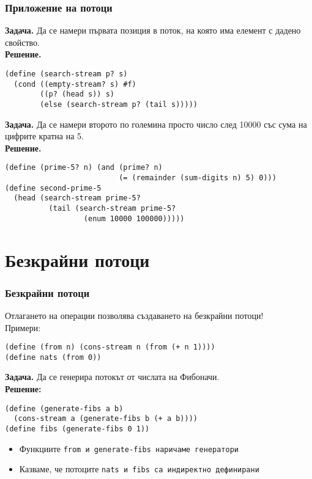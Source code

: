\documentclass{beamer}
\begin{document}
\begin{frame}[fragile]
  \frametitle{Приложение на потоци}

  \small
  \textbf{Задача.} Да се намери първата позиция в поток, на която има елемент с дадено свойство.\\
  \pause
  \textbf{Решение.}
\begin{lstlisting}
(define (search-stream p? s)
  (cond ((empty-stream? s) #f)
        ((p? (head s)) s)
        (else (search-stream p? (tail s)))))
\end{lstlisting}
  \pause
  \textbf{Задача.} Да се намери второто по големина просто число след 10000 със сума на цифрите кратна на 5.\\
  \pause
  \textbf{Решение.}
\begin{lstlisting}
(define (prime-5? n) (and (prime? n)
                          (= (remainder (sum-digits n) 5) 0)))
(define second-prime-5
  (head (search-stream prime-5?
          (tail (search-stream prime-5?
                  (enum 10000 100000)))))
\end{lstlisting}
\end{frame}

\section{Безкрайни потоци}

\begin{frame}[fragile]
  \frametitle{Безкрайни потоци}

  Отлагането на операции позволява създаването на \alert{безкрайни потоци}!\\[1em]
  \pause
  Примери:
\begin{lstlisting}
(define (from n) (cons-stream n (from (+ n 1))))
(define nats (from 0))
\end{lstlisting}
  \pause
  \textbf{Задача.} Да се генерира потокът от числата на Фибоначи.\\
  \pause
  \textbf{Решение:}
\begin{lstlisting}
(define (generate-fibs a b)
  (cons-stream a (generate-fibs b (+ a b))))
(define fibs (generate-fibs 0 1))
\end{lstlisting}
  \pause
  \begin{itemize}
  \item Функциите \tt{from} и \tt{generate-fibs} наричаме \alert{генератори}
  \item Казваме, че потоците \tt{nats} и \tt{fibs} са \alert{индиректно дефинирани}
  \end{itemize}
\end{frame}
\end{document}
